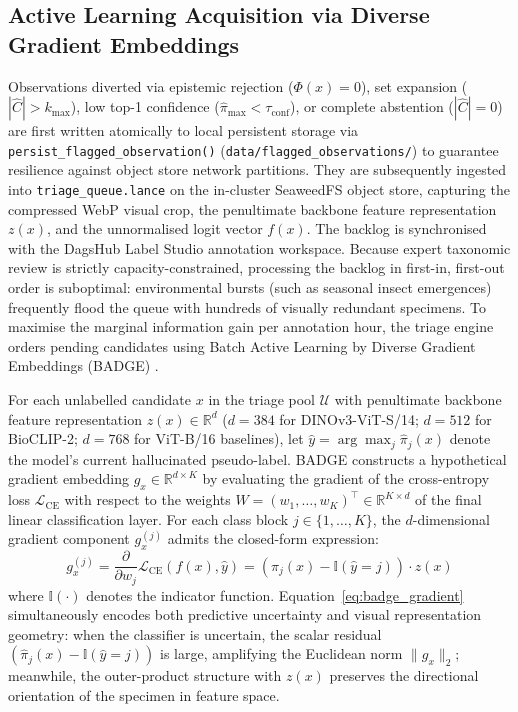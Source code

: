 \subsection{Active Learning Acquisition via Diverse Gradient Embeddings}
\label{subsec:badge_active_learning}

Observations diverted via epistemic rejection ($\Phi(x) = 0$), set expansion ($|\hat{C}| > k_{\max}$), low top-1 confidence ($\hat{\pi}_{\max} < \tau_{\text{conf}}$), or complete abstention ($|\hat{C}| = 0$) are first written atomically to local persistent storage via \nolinkurl{persist_flagged_observation()} (\nolinkurl{data/flagged_observations/}) to guarantee resilience against object store network partitions. They are subsequently ingested into \nolinkurl{triage_queue.lance} on the in-cluster SeaweedFS object store, capturing the compressed WebP visual crop, the penultimate backbone feature representation $z(x)$, and the unnormalised logit vector $f(x)$. The backlog is synchronised with the DagsHub Label Studio annotation workspace. Because expert taxonomic review is strictly capacity-constrained, processing the backlog in first-in, first-out order is suboptimal: environmental bursts (such as seasonal insect emergences) frequently flood the queue with hundreds of visually redundant specimens. To maximise the marginal information gain per annotation hour, the triage engine orders pending candidates using Batch Active Learning by Diverse Gradient Embeddings (BADGE) \cite{ash2020deep, ren2021deepactive}.

For each unlabelled candidate $x$ in the triage pool $\mathcal{U}$ with penultimate backbone feature representation $z(x) \in \mathbb{R}^d$ ($d = 384$ for DINOv3-ViT-S/14; $d = 512$ for BioCLIP-2; $d = 768$ for ViT-B/16 baselines), let $\hat{y} = \arg\max_j \hat{\pi}_j(x)$ denote the model's current hallucinated pseudo-label. BADGE constructs a hypothetical gradient embedding $g_x \in \mathbb{R}^{d \times K}$ by evaluating the gradient of the cross-entropy loss $\mathcal{L}_{\text{CE}}$ with respect to the weights $W = (w_1, \dots, w_K)^\top \in \mathbb{R}^{K \times d}$ of the final linear classification layer. For each class block $j \in \{1, \dots, K\}$, the $d$-dimensional gradient component $g_x^{(j)}$ admits the closed-form expression:
\begin{equation}
g_x^{(j)} = \frac{\partial}{\partial w_j} \mathcal{L}_{\text{CE}}\left(f(x), \hat{y}\right) = \left( \hat{\pi}_j(x) - \mathbb{I}(\hat{y} = j) \right) \cdot z(x)
\label{eq:badge_gradient}
\end{equation}
where $\mathbb{I}(\cdot)$ denotes the indicator function. Equation~\ref{eq:badge_gradient} simultaneously encodes both predictive uncertainty and visual representation geometry: when the classifier is uncertain, the scalar residual $(\hat{\pi}_j(x) - \mathbb{I}(\hat{y} = j))$ is large, amplifying the Euclidean norm $\|g_x\|_2$; meanwhile, the outer-product structure with $z(x)$ preserves the directional orientation of the specimen in feature space.

